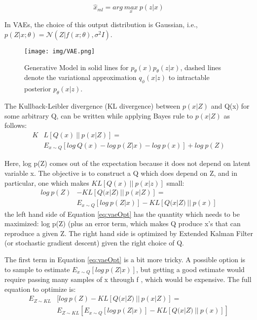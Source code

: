 \documentclass{article}
\begin{document}
\begin{equation}
    \hat{x}_{ml} = arg \: \underset{x}{max} \:  p(z | x)
\end{equation}
 

In VAEs, the choice of this output distribution is Gaussian, i.e., $p( Z | x; \theta) = \mathcal{N} (Z | f(x; \theta), \sigma^{2}I)$.  

\begin{figure}[H]
  \centering
  \texttt{[image: img/VAE.png]}
  \caption{ Generative Model in solid lines for $p_{\theta}(x)p_{\theta}(z|x)$, dashed lines denote the variational approximation $q_{\phi}(x|z)$ to intractable posterior $p_{\theta}(x|z)$.  }
  \label{fig:fig1}
\end{figure}

The Kullback-Leibler divergence (KL divergence) between $p(x | Z)$ and Q(x) for some arbitrary Q, can be written while applying Bayes rule to $p(x | Z)$ as follows:
\begin{equation}
    \begin{split}
    K&L[Q(x)\: ||\: p(x | Z)] = \\
  & E_{x\sim Q}[log\: Q(x) - log\: p(Z | x) - log\: p(x)] + log\: p(Z)
    \end{split}
\end{equation}

Here, log p(Z) comes out of the expectation because it does not depend on latent variable x. The objective is to construct a Q which does depend on Z, and in particular, one which makes $KL[Q(x)\: ||\: p(x | z)]$ small:
\begin{equation}\label{eq:vaeOpt}
    \begin{split}
        log\: p(Z) &- KL[Q(x | Z)\: ||\: p(x | Z)] = \\
        &E_{x\sim Q}[log\: p(Z | x)] - KL[Q(x | Z)\: ||\: p(x)] 
    \end{split} 
\end{equation}
the left hand side of Equation \ref{eq:vaeOpt} has the quantity which needs to be maximized: log p(Z) (plus an error term, which makes Q produce x’s that can reproduce a given Z. The right hand side is optimized by Extended Kalman Filter (or stochastic gradient descent) given the right choice of Q.  

\par
The first term in Equation \ref{eq:vaeOpt} is a bit more tricky. A possible option is to sample to estimate $E_{x\sim Q}[log\: p(Z | x)]$, but getting a good estimate would require passing many samples of x through f , which would be expensive. The full equation to optimize is:
\begin{equation}\label{vae2}
    \begin{split}
        E_{Z\sim KL}&[log\: p(Z) - KL[Q(x|Z)\: ||\: p(x | Z)] = \\
        & E_{Z\sim KL}[E_{x\sim Q}[log\: p(Z | x)] - KL[Q(x|Z)\: ||\: p(x)]] 
    \end{split}  
\end{equation}
\end{document}
